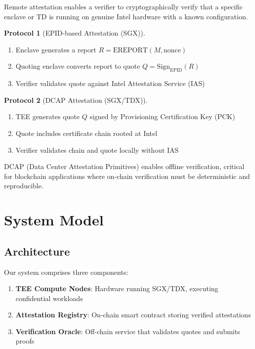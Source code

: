 \documentclass[11pt,a4paper]{article}
\theoremstyle{definition}
\newtheorem{protocol}{Protocol}
\begin{document}
Remote attestation enables a verifier to cryptographically verify that a specific enclave or TD is running on genuine Intel hardware with a known configuration.

\begin{protocol}[EPID-based Attestation (SGX)]
\begin{enumerate}
    \item Enclave generates a report $R = \text{EREPORT}(M, \text{nonce})$
    \item Quoting enclave converts report to quote $Q = \text{Sign}_{\text{EPID}}(R)$
    \item Verifier validates quote against Intel Attestation Service (IAS)
\end{enumerate}
\end{protocol}

\begin{protocol}[DCAP Attestation (SGX/TDX)]
\begin{enumerate}
    \item TEE generates quote $Q$ signed by Provisioning Certification Key (PCK)
    \item Quote includes certificate chain rooted at Intel
    \item Verifier validates chain and quote locally without IAS
\end{enumerate}
\end{protocol}

DCAP (Data Center Attestation Primitives) enables offline verification, critical for blockchain applications where on-chain verification must be deterministic and reproducible.

\section{System Model}

\subsection{Architecture}

Our system comprises three components:
\begin{enumerate}
    \item \textbf{TEE Compute Nodes}: Hardware running SGX/TDX, executing confidential workloads
    \item \textbf{Attestation Registry}: On-chain smart contract storing verified attestations
    \item \textbf{Verification Oracle}: Off-chain service that validates quotes and submits proofs
\end{enumerate}
\end{document}
